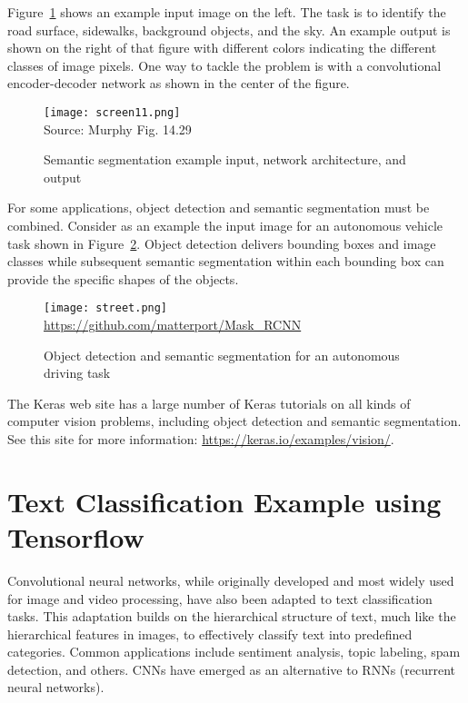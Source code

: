 Figure~\ref{fig:screen11_chap16} shows an example input image on the left. The task is to identify the road surface, sidewalks, background objects, and the sky. An example output is shown on the right of that figure with different colors indicating the different classes of image pixels. One way to tackle the problem is with a convolutional encoder-decoder network as shown in the center of the figure.

\begin{figure}
\centering
\texttt{[image: screen11.png]} \\

\scriptsize Source: Murphy Fig. 14.29
\normalsize
\caption{Semantic segmentation example input, network architecture, and output}
\label{fig:screen11_chap16}
\end{figure}

For some applications, object detection and semantic segmentation must be combined. Consider as an example the input image for an autonomous vehicle task shown in Figure~\ref{fig:street}. Object detection delivers bounding boxes and image classes while subsequent semantic segmentation within each bounding box can provide the specific shapes of the objects.

\begin{figure}
\centering
\texttt{[image: street.png]} \\

\scriptsize \url{https://github.com/matterport/Mask_RCNN}
\caption[Object detection and semantic segmentation example]{Object detection and semantic segmentation for an autonomous driving task}
\label{fig:street}
\end{figure}

\begin{resourcebox}
The Keras web site has a large number of Keras tutorials on all kinds of computer vision problems, including object detection and semantic segmentation. See this site for more information: \small\url{https://keras.io/examples/vision/}\normalsize.
\end{resourcebox}

\section{Text Classification Example using Tensorflow}

Convolutional neural networks, while originally developed and most widely used for image and video processing, have also been adapted to text classification tasks. This adaptation builds on the hierarchical structure of text, much like the hierarchical features in images, to effectively classify text into predefined categories. Common applications include sentiment analysis, topic labeling, spam detection, and others. CNNs have emerged as an alternative to RNNs (recurrent neural networks).

